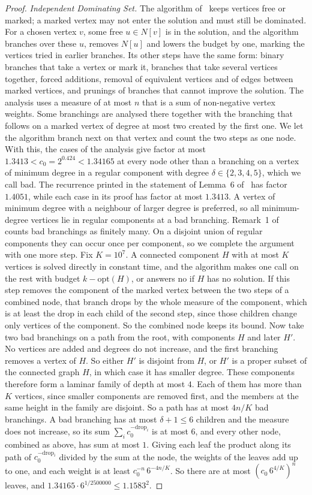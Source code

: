 \documentclass[11pt]{article}
\theoremstyle{remark}
\begin{document}
\begin{proof}
\emph{Independent Dominating Set.} The algorithm of~\cite{BEP10} keeps vertices free or marked; a marked vertex may not enter the solution and must still be dominated. For a chosen vertex $v$, some free $u \in N[v]$ is in the solution, and the algorithm branches over these $u$, removes $N[u]$ and lowers the budget by one, marking the vertices tried in earlier branches. Its other steps have the same form: binary branches that take a vertex or mark it, branches that take several vertices together, forced additions, removal of equivalent vertices and of edges between marked vertices, and prunings of branches that cannot improve the solution. The analysis uses a measure of at most $n$ that is a sum of non-negative vertex weights. Some branchings are analysed there together with the branching that follows on a marked vertex of degree at most two created by the first one. We let the algorithm branch next on that vertex and count the two steps as one node. With this, the cases of the analysis give factor at most $1.3413 < c_0 = 2^{0.424} < 1.34165$ at every node other than a branching on a vertex of minimum degree in a regular component with degree $\delta \in \{2, 3, 4, 5\}$, which we call bad. The recurrence printed in the statement of Lemma~6 of~\cite{BEP10} has factor $1.4051$, while each case in its proof has factor at most $1.3413$. A vertex of minimum degree with a neighbour of larger degree is preferred, so all minimum-degree vertices lie in regular components at a bad branching. Remark~1 of~\cite{BEP10} counts bad branchings as finitely many. On a disjoint union of regular components they can occur once per component, so we complete the argument with one more step. Fix $K = 10^7$. A connected component $H$ with at most $K$ vertices is solved directly in constant time, and the algorithm makes one call on the rest with budget $k - \mathrm{opt}(H)$, or answers no if $H$ has no solution. If this step removes the component of the marked vertex between the two steps of a combined node, that branch drops by the whole measure of the component, which is at least the drop in each child of the second step, since those children change only vertices of the component. So the combined node keeps its bound. Now take two bad branchings on a path from the root, with components $H$ and later $H'$. No vertices are added and degrees do not increase, and the first branching removes a vertex of $H$. So either $H'$ is disjoint from $H$, or $H'$ is a proper subset of the connected graph $H$, in which case it has smaller degree. These components therefore form a laminar family of depth at most $4$. Each of them has more than $K$ vertices, since smaller components are removed first, and the members at the same height in the family are disjoint. So a path has at most $4n/K$ bad branchings. A bad branching has at most $\delta + 1 \le 6$ children and the measure does not increase, so its sum $\sum_i c_0^{-\mathrm{drop}_i}$ is at most $6$, and every other node, combined as above, has sum at most $1$. Giving each leaf the product along its path of $c_0^{-\mathrm{drop}_i}$ divided by the sum at the node, the weights of the leaves add up to one, and each weight is at least $c_0^{-n}\, 6^{-4n/K}$. So there are at most $(c_0\, 6^{4/K})^n$ leaves, and $1.34165 \cdot 6^{1/2500000} \le 1.1583^2$. 
\end{proof}
\end{document}
